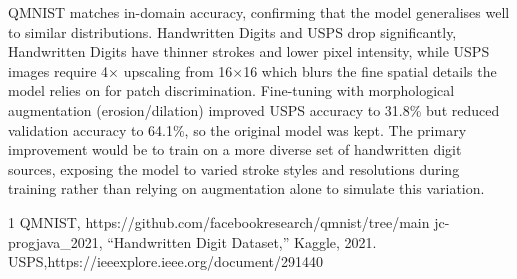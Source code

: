 \documentclass[conference]{IEEEtran}
\begin{document}
QMNIST matches in-domain accuracy, confirming that the model generalises well to similar distributions. Handwritten Digits and USPS drop significantly, Handwritten Digits have thinner strokes and lower pixel intensity, while USPS images require 4$\times$ upscaling from 16$\times$16 which blurs the fine spatial details the model relies on for patch discrimination. Fine-tuning with morphological augmentation (erosion/dilation) improved USPS accuracy to 31.8\% but reduced validation accuracy to 64.1\%, so the original model was kept. The primary improvement would be to train on a more diverse set of handwritten digit sources, exposing the model to varied stroke styles and resolutions during training rather than relying on augmentation alone to simulate this variation.

\begin{thebibliography}{1}
 QMNIST, https://github.com/facebookresearch/qmnist/tree/main
 jc-progjava\_2021, ``Handwritten Digit Dataset,'' Kaggle, 2021.
 USPS,https://ieeexplore.ieee.org/document/291440

\end{thebibliography}
\end{document}
